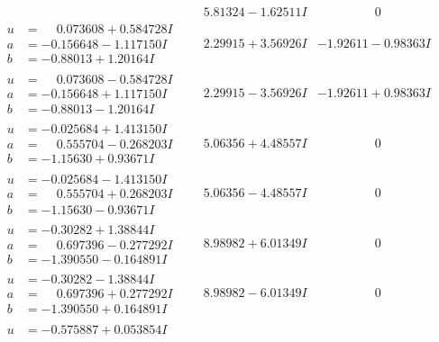 \documentclass[1p]{elsarticle_modified}
\theoremstyle{definition}
\begin{document}
$$\begin{array}{c|c|c}
 & \phantom{-}5.81324 - 1.62511 I & \phantom{-0.000000 } 0 \\ \hline\begin{aligned}
u &= \phantom{-}0.073608 + 0.584728 I \\
a &= -0.156648 - 1.117150 I \\
b &= -0.88013 + 1.20164 I\end{aligned}
 & \phantom{-}2.29915 + 3.56926 I & -1.92611 - 0.98363 I \\ \hline\begin{aligned}
u &= \phantom{-}0.073608 - 0.584728 I \\
a &= -0.156648 + 1.117150 I \\
b &= -0.88013 - 1.20164 I\end{aligned}
 & \phantom{-}2.29915 - 3.56926 I & -1.92611 + 0.98363 I \\ \hline\begin{aligned}
u &= -0.025684 + 1.413150 I \\
a &= \phantom{-}0.555704 - 0.268203 I \\
b &= -1.15630 + 0.93671 I\end{aligned}
 & \phantom{-}5.06356 + 4.48557 I & \phantom{-0.000000 } 0 \\ \hline\begin{aligned}
u &= -0.025684 - 1.413150 I \\
a &= \phantom{-}0.555704 + 0.268203 I \\
b &= -1.15630 - 0.93671 I\end{aligned}
 & \phantom{-}5.06356 - 4.48557 I & \phantom{-0.000000 } 0 \\ \hline\begin{aligned}
u &= -0.30282 + 1.38844 I \\
a &= \phantom{-}0.697396 - 0.277292 I \\
b &= -1.390550 - 0.164891 I\end{aligned}
 & \phantom{-}8.98982 + 6.01349 I & \phantom{-0.000000 } 0 \\ \hline\begin{aligned}
u &= -0.30282 - 1.38844 I \\
a &= \phantom{-}0.697396 + 0.277292 I \\
b &= -1.390550 + 0.164891 I\end{aligned}
 & \phantom{-}8.98982 - 6.01349 I & \phantom{-0.000000 } 0 \\ \hline\begin{aligned}
u &= -0.575887 + 0.053854 I \\

\end{aligned}
\end{array}$$
\end{document}
